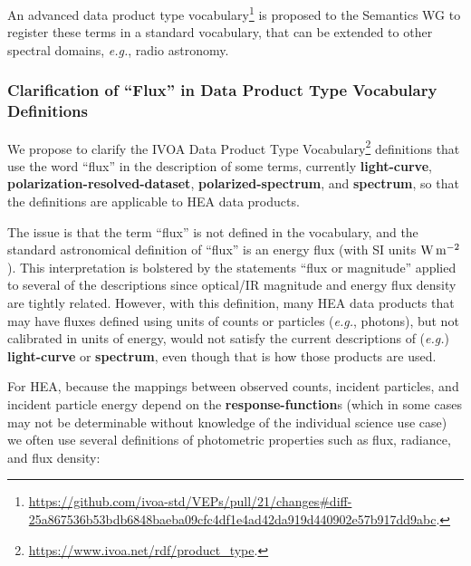 \documentclass[11pt,a4paper]{ivoa}
\begin{document}
An advanced data product type vocabulary\footnote{\url{https://github.com/ivoa-std/VEPs/pull/21/changes\#diff-25a867536b53bdb6848baeba09cfc4df1e4ad42da919d440902e57b917dd9abc}.} is proposed to the Semantics WG to register these terms in a standard vocabulary, that can be extended to other spectral domains, {\em e.g.\/}, radio astronomy.




%

\subsubsection{Clarification of ``Flux'' in Data Product Type Vocabulary Definitions}
\label{sec:flux}

We propose to clarify the IVOA Data Product Type Vocabulary\footnote{\url{https://www.ivoa.net/rdf/product_type}.} definitions that use the word ``flux'' in the description of some terms, currently {\bf light-curve}, {\bf polarization-resolved-dataset}, {\bf polarized-spectrum}, and {\bf spectrum}, so that the definitions are applicable to \gls{HEA} data products.

The issue is that the term ``flux'' is not defined in the vocabulary, and the standard astronomical definition of ``flux'' is an energy flux (with SI units $\rm W\,m^{-2}$).  This interpretation is bolstered by the statements ``flux or magnitude'' applied to several of the descriptions since optical/IR magnitude and energy flux density are tightly related.  However, with this definition, many \gls{HEA} data products that may have fluxes defined using units of counts or particles ({\em e.g.\/}, photons), but not calibrated in units of energy, would not satisfy the current  descriptions of ({\em e.g.\/}\null) {\bf light-curve} or {\bf spectrum}, even though that is how those products are used.

For \gls{HEA}, because the mappings between observed counts, incident particles, and incident particle energy depend on the {\bf response-function}s (which in some cases may not be determinable without knowledge of the individual science use case) we often use several definitions of photometric properties such as flux, radiance, and flux density:
\end{document}

